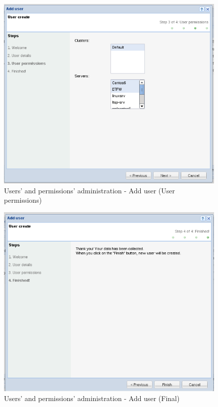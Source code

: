 {\begin{figure}[H]
        \begin{center}
        \includegraphics[scale=0.4]{screenshots/users/create_user_wiz_03.png}
        \caption{Users' and permissions' administration - Add user (User permissions)}
        \label{fig:create_user_wiz_03}
        \end{center}
\end{figure}

\begin{figure}[H]
        \begin{center}
        \includegraphics[scale=0.4]{screenshots/users/create_user_wiz_04.png}
        \caption{Users' and permissions' administration - Add user (Final)}
        \label{fig:create_user_wiz_04}
        \end{center}
\end{figure}
}

